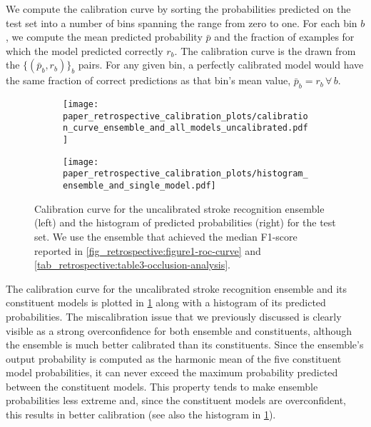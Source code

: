 We compute the calibration curve by sorting the probabilities predicted on the test set into a number of bins spanning the range from zero to one. For each bin $b$, we compute the mean predicted probability $\bar{p}$ and the fraction of examples for which the model predicted correctly $r_{b}$. The calibration curve is the drawn from the $\{(\bar{p}_{b}, r_{b})\}_b$ pairs. For any given bin, a perfectly calibrated model would have the same fraction of correct predictions as that bin's mean value, $\bar{p}_{b} = r_{b}\,\forall\,b$. 

\begin{figure}
    \centering
    \begin{subfigure}[c]{0.49\columnwidth}
        \centering
        \texttt{[image: paper\_retrospective\_calibration\_plots/calibration\_curve\_ensemble\_and\_all\_models\_uncalibrated.pdf]}
    \end{subfigure}
    \hfill
    \begin{subfigure}[c]{0.49\columnwidth}
        \centering
        \texttt{[image: paper\_retrospective\_calibration\_plots/histogram\_ensemble\_and\_single\_model.pdf]}
    \end{subfigure}
    \caption[Calibration curve for the uncalibrated stroke recognition ensemble and empirical distribution of predicted probabilities.]{ Calibration curve for the uncalibrated stroke recognition ensemble (left) and the histogram of predicted probabilities (right) for the test set. We use the ensemble that achieved the median F1-score reported in \cref{fig_retrospective:figure1-roc-curve} and \cref{tab_retrospective:table3-occlusion-analysis}.}
    \label{fig_discussion:retrospective-paper-calibration-curve-of-uncalibrated-model}
\end{figure}

The calibration curve for the uncalibrated stroke recognition ensemble and its constituent models is plotted in \cref{fig_discussion:retrospective-paper-calibration-curve-of-uncalibrated-model} along with a histogram of its predicted probabilities. The miscalibration issue that we previously discussed is clearly visible as a strong overconfidence for both ensemble and constituents, although the ensemble is much better calibrated than its constituents. Since the ensemble's output probability is computed as the harmonic mean of the five constituent model probabilities, it can never exceed the maximum probability predicted between the constituent models. This property tends to make ensemble probabilities less extreme and, since the constituent models are overconfident, this results in better calibration (see also the histogram in \cref{fig_discussion:retrospective-paper-calibration-curve-of-uncalibrated-model}). 

